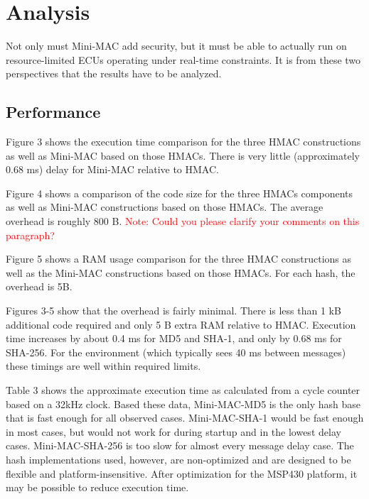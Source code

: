 \section{Analysis}

Not only must Mini-MAC add security, but it must be able to actually run on resource-limited ECUs operating under real-time constraints. It is from these two perspectives that the results have to be analyzed. 

\subsection{Performance}
Figure 3 shows the execution time comparison for the three HMAC constructions as well as Mini-MAC based on those HMACs. There is very little (approximately 0.68 ms) delay for Mini-MAC relative to HMAC.

Figure 4 shows a comparison of the code size for the three HMACs components as well as Mini-MAC constructions based on those HMACs. The average overhead is roughly 800 B.
\textcolor{red}{Note: Could you please clarify your comments on this paragraph?}

Figure 5 shows a RAM usage comparison for the three HMAC constructions as well as the Mini-MAC constructions based on those HMACs. For each hash, the overhead is 5B.

Figures 3-5 show that the overhead is fairly minimal. There is less than 1 kB additional code required and only 5 B extra RAM relative to HMAC. Execution time increases by about 0.4 ms for MD5 and SHA-1, and only by 0.68 ms for SHA-256. For the environment (which typically sees 40 ms between messages) these timings are well within required limits.

Table 3 shows the approximate execution time as calculated from a cycle counter based on a 32kHz clock. Based these data, Mini-MAC-MD5 is the only hash base that is fast enough for all observed cases. Mini-MAC-SHA-1 would be fast enough in most cases, but would not work for during startup and in the lowest delay cases. Mini-MAC-SHA-256 is too slow for almost every message delay case. The hash implementations used, however, are non-optimized and are designed to be flexible and platform-insensitive. After optimization for the MSP430 platform, it may be possible to reduce execution time.


